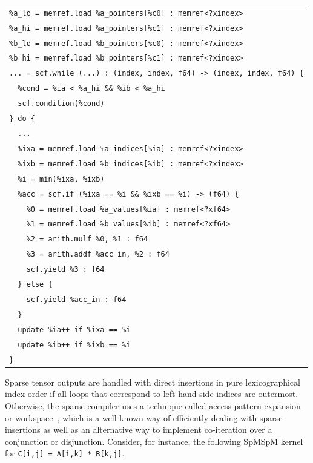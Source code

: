 \documentclass[10pt]{article}
\newcommand{\exam}{\begin{flushleft}\scriptsize\begin{tabular}{l}}
\newcommand{\maxe}{\end{tabular}\end{flushleft}}
\begin{document}
\exam
\verb"%a_lo = memref.load %a_pointers[%c0] : memref<?xindex>" \\
\verb"%a_hi = memref.load %a_pointers[%c1] : memref<?xindex>" \\
\verb"%b_lo = memref.load %b_pointers[%c0] : memref<?xindex>" \\
\verb"%b_hi = memref.load %b_pointers[%c1] : memref<?xindex>" \\
\verb"... = scf.while (...) : (index, index, f64) -> (index, index, f64) {" \\
\verb"  %cond = %ia < %a_hi && %ib < %a_hi" \\
\verb"  scf.condition(%cond)" \\
\verb"} do {" \\
\verb"  ..." \\
\verb"  %ixa = memref.load %a_indices[%ia] : memref<?xindex>" \\
\verb"  %ixb = memref.load %b_indices[%ib] : memref<?xindex>" \\
\verb"  %i = min(%ixa, %ixb)" \\
\verb"  %acc = scf.if (%ixa == %i && %ixb == %i) -> (f64) {" \\
\verb"    %0 = memref.load %a_values[%ia] : memref<?xf64>" \\
\verb"    %1 = memref.load %b_values[%ib] : memref<?xf64>" \\
\verb"    %2 = arith.mulf %0, %1 : f64" \\
\verb"    %3 = arith.addf %acc_in, %2 : f64" \\
\verb"    scf.yield %3 : f64" \\
\verb"  } else {" \\
\verb"    scf.yield %acc_in : f64" \\
\verb"  }" \\
\verb"  update %ia++ if %ixa == %i" \\
\verb"  update %ib++ if %ixb == %i" \\
\verb"}" \\ 
\maxe

Sparse tensor outputs are handled with direct insertions in pure lexicographical index order if all loops that correspond to left-hand-side indices are outermost. Otherwise, the sparse compiler uses a technique called access pattern expansion or workspace~\cite{drbik,duff,rose,taco2018,sergio,pugh1998sipr}, which is a well-known way of efficiently dealing with sparse insertions as well as an alternative way to implement co-iteration over a conjunction or disjunction.
Consider, for instance, the following SpMSpM kernel for \texttt{C[i,j] = A[i,k] * B[k,j]}.
\end{document}
